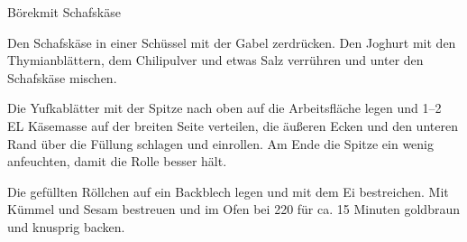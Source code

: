 \begin{recipe}{Börek}{mit Schafskäse}
  \label{Börek}
  \inglist

  \steps

  Den Schafskäse in einer Schüssel mit der Gabel zerdrücken. Den Joghurt mit
  den Thymianblättern, dem Chilipulver und etwas Salz verrühren und unter den
  Schafskäse mischen.

  Die Yufkablätter mit der Spitze nach oben auf die Arbeitsfläche legen und 1--2
  EL Käsemasse auf der breiten Seite verteilen, die äußeren Ecken und den
  unteren Rand über die Füllung schlagen und einrollen. Am Ende die Spitze ein
  wenig anfeuchten, damit die Rolle besser hält.

  Die gefüllten Röllchen auf ein Backblech legen und mit dem Ei bestreichen. Mit
  Kümmel und Sesam bestreuen und im Ofen bei 220 \celsius für ca. 15 Minuten
  goldbraun und knusprig backen.

 \end{recipe}
